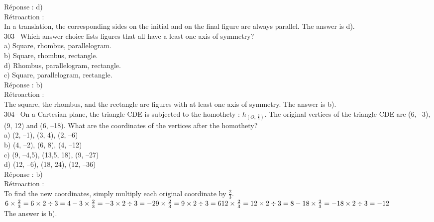 \documentclass[letterpaper, 12pt]{article}
\begin{document}
R\'eponse : d)\\

R\'etroaction : \\
In a translation,  the corresponding sides on the initial and on the final figure are always parallel. The answer is d).\\

303-- Which answer choice lists figures that all have a least one axis of symmetry?\\

a) Square, rhombus, parallelogram.\\
b) Square, rhombus, rectangle.\\
d) Rhombus, parallelogram, rectangle.\\
c) Square, parallelogram, rectangle.\\

R\'eponse : b)\\

R\'etroaction :\\
The square, the rhombus, and the rectangle are figures with at least one axis of symmetry. The answer is b).\\



304-- On a Cartesian plane, the triangle CDE is subjected to the
homothety : $h_{\left( O,\,\frac{2}{3}\right)}$.  The original
vertices of the triangle CDE are (6,
--3), (9, 12) and (6, --18).  What are the coordinates of the vertices after the homothety?\\

a) (2, --1), (3, 4), (2, --6)\\
b) (4, --2), (6, 8), (4, --12)\\
c) (9, --4,5), (13,5, 18), (9, --27)\\
d) (12, --6), (18, 24), (12, --36)\\

R\'eponse : b)\\

R\'etroaction :\\
To find the new coordinates, simply multiply each original coordinate by $\frac{2}{3}$.\\[2mm]
$6\times\frac{2}{3}=6\times2\div3=4\\[2mm]
-3\times\frac{2}{3}=-3\times2\div3=-2\\[2mm]
9\times\frac{2}{3}=9\times2\div3=6\\[2mm]
12\times\frac{2}{3}=12\times2\div3=8\\[2mm]
-18\times\frac{2}{3}=-18\times2\div3=-12$\\[2mm]
The answer is b).\\
\end{document}
